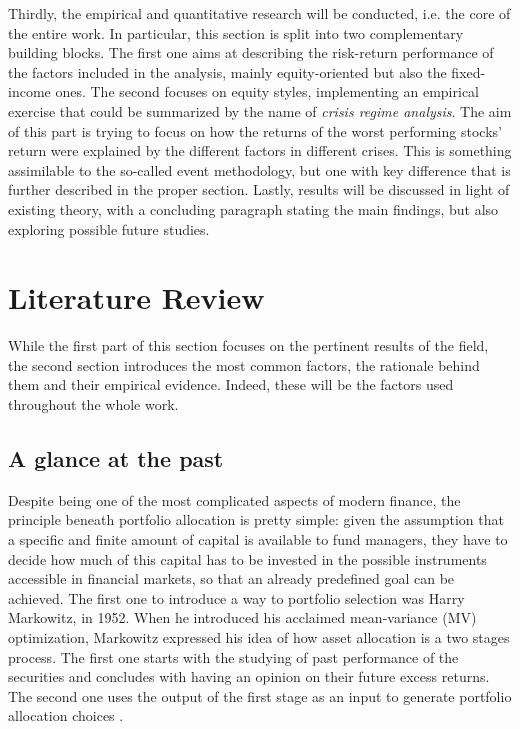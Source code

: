 \documentclass[12pt]{article}
\begin{document}
Thirdly, the empirical and quantitative research will be conducted, i.e. the core of the entire work. In particular, this section is split into two complementary building blocks. The first one aims at describing the risk-return performance of the factors included in the analysis, mainly equity-oriented but also the fixed-income ones. The second focuses on equity styles, implementing an empirical exercise that could be summarized by the name of \textit{crisis regime analysis}. The aim of this part is trying to focus on how the returns of the worst performing stocks' return were explained by the different factors in different crises. This is something assimilable to the so-called event methodology, but one with key difference that is further described in the proper section. Lastly, results will be discussed in light of existing theory, with a concluding paragraph stating the main findings, but also exploring possible future studies.

\newpage
\section{Literature Review} \label{section:2}

While the first part of this section focuses on the pertinent results of the field, the second section introduces the most common factors, the rationale behind them and their empirical evidence. Indeed, these will be the factors used throughout the whole work.

\subsection{A glance at the past}

Despite being one of the most complicated aspects of modern finance, the principle beneath portfolio allocation is pretty simple: given the assumption that a specific and finite amount of capital is available to fund managers, they have to decide how much of this capital has to be invested in the possible instruments accessible in financial markets, so that an already predefined goal can be achieved. The first one to introduce a way to portfolio selection was Harry Markowitz, in 1952. When he introduced his acclaimed mean-variance (MV) optimization, Markowitz expressed his idea of how asset allocation is a two stages process. The first one starts with the studying of past performance of the securities and concludes with having an opinion on their future excess returns. The second one uses the output of the first stage as an input to generate portfolio allocation choices \cite{selection1952harry}.
\end{document}
